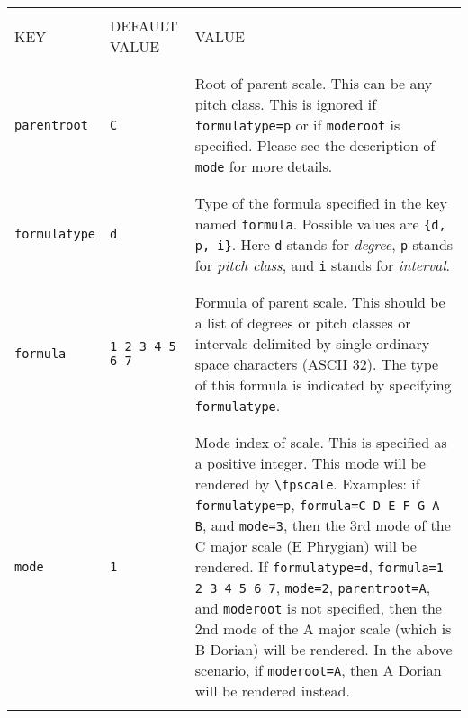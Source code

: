 \documentclass[12pt,letterpaper]{article}
\begin{document}
\begin{table}[H]\tiny\begin{tabular}{|l|l|p{8cm}|}
\hline

&&\\
KEY & DEFAULT VALUE & VALUE\\
&&\\

\hline

&&\\
\texttt{parentroot} & \texttt{C} & Root of parent scale. This can be any pitch class. This is ignored if \texttt{formulatype=p} or if \texttt{moderoot} is specified. Please see the description of \texttt{mode} for more details.\\
&&\\

\hline

&&\\
\texttt{formulatype} & \texttt{d} & Type of the formula specified in the key named \texttt{formula}. Possible values are \texttt{\{d, p, i\}}. Here \texttt{d} stands for \textit{degree}, \texttt{p} stands for \textit{pitch class}, and \texttt{i} stands for \textit{interval}.\\
&&\\

\hline

&&\\
\texttt{formula} & \texttt{1 2 3 4 5 6 7} & Formula of parent scale. This should be a list of degrees or pitch classes or intervals delimited by single ordinary space characters (ASCII 32). The type of this formula is indicated by specifying \texttt{formulatype}.\\
&&\\

\hline

&&\\
\texttt{mode} & \texttt{1} & Mode index of scale. This is specified as a positive integer. This mode will be rendered by \texttt{\textbackslash fpscale}. Examples: if \texttt{formulatype=p}, \texttt{formula=C D E F G A B}, and \texttt{mode=3}, then the 3rd mode of the C major scale (E Phrygian) will be rendered. If \texttt{formulatype=d}, \texttt{formula=1 2 3 4 5 6 7}, \texttt{mode=2}, \texttt{parentroot=A}, and \texttt{moderoot} is not specified, then the 2nd mode of the A major scale (which is B Dorian) will be rendered. In the above scenario, if \texttt{moderoot=A}, then A Dorian will be rendered instead.\\
&&\\


\end{tabular}
\end{table}
\end{document}
